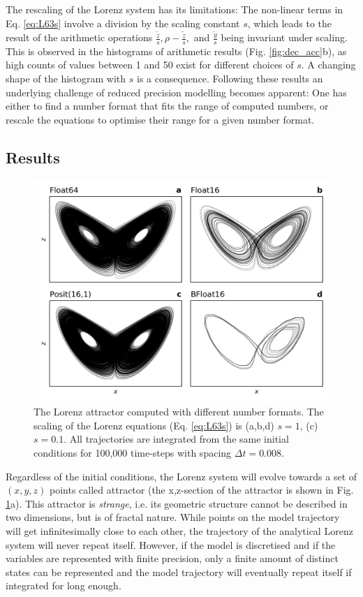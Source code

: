 \documentclass[draft]{agujournal2019}
\begin{document}
The rescaling of the Lorenz system has its limitations: The non-linear terms in Eq. \ref{eq:L63s} involve a division by the scaling constant $s$, which leads to the result of the arithmetic operations $\tfrac{\tilde{z}}{s}, \rho - \tfrac{\tilde{z}}{s},$ and $\tfrac{\tilde{y}}{s}$ being invariant under scaling. This is observed in the histograms of arithmetic results (Fig. \ref{fig:dec_acc}b), as high counts of values between 1 and 50 exist for different choices of $s$. A changing shape of the histogram with $s$ is a consequence. Following these results an underlying challenge of reduced precision modelling becomes apparent: One has either to find a number format that fits the range of computed numbers, or rescale the equations to optimise their range for a given number format.

\subsection{Results}
\label{sec:lorenz}


\begin{figure}
\includegraphics[width=1\textwidth]{../plots/lorenz_attractor.png}
\caption{The Lorenz attractor computed with different number formats. The scaling of the Lorenz equations (Eq. \ref{eq:L63s}) is (a,b,d) $s=1$, (c) $s=0.1$. All trajectories are integrated from the same initial conditions for 100,000 time-steps with spacing $\Delta t = 0.008$.}
\label{fig:L63}
\end{figure}

Regardless of the initial conditions, the Lorenz system will evolve towards a set of $(x,y,z)$ points called attractor (the x,z-section of the attractor is shown in Fig. \ref{fig:L63}a). This attractor is \emph{strange}, i.e. its geometric structure cannot be described in two dimensions, but is of fractal nature. 
While points on the model trajectory will get infinitesimally close to each other, the trajectory of the analytical Lorenz system will never repeat itself. However, if the model is discretised and if the variables are represented with finite precision, only a finite amount of distinct states can be represented and the model trajectory will eventually repeat itself if integrated for long enough. 
\end{document}
